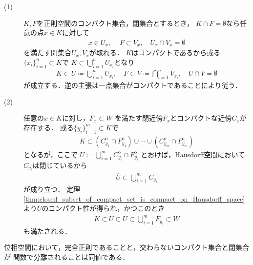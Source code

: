 	\begin{prf}\mbox{}
		\begin{description}
			\item[(1)]
				$K,F$を正則空間のコンパクト集合，閉集合とするとき，
				$K \cap F = \emptyset$なら任意の点$x \in K$に対して
				\begin{align}
					x \in U_x,\ \quad F \subset V_x,
					\quad U_x \cap V_x = \emptyset
				\end{align}
				を満たす開集合$U_x,V_x$が取れる．
				$K$はコンパクトであるから或る$\{x_i\}_{i=1}^n \subset K$で
				$K \subset \bigcup_{i=1}^n U_{x_i}$となり
				\begin{align}
					K \subset U \coloneqq \bigcup_{i=1}^n U_{x_i},
					\quad F \subset V \coloneqq \bigcap_{i=1}^n V_{x_i},
					\quad U \cap V = \emptyset
				\end{align}
				が成立する．逆の主張は一点集合がコンパクトであることにより従う．
			\item[(2)]
				任意の$x \in K$に対し，$F_x \subset W$
				を満たす閉近傍$F_x$とコンパクトな近傍$C_x$が存在する．
				或る$\{y_i\}_{i=1}^m \subset K$で
				\begin{align}
					K \subset 
					\left(C_{y_1}^{\mathrm{o}} \cap F_{y_1}^{\mathrm{o}}\right) 
					\cup \cdots \cup 
					\left(C_{y_m}^{\mathrm{o}} \cap F_{y_m}^{\mathrm{o}}\right)
				\end{align}
				となるが，ここで
				$U \coloneqq 
				\bigcup_{i=1}^m C_{y_i}^{\mathrm{o}} \cap F_{y_i}^{\mathrm{o}}$
				とおけば，Hausdorff空間において$C_{y_i}$は閉じているから
				\begin{align}
					\overline{U} \subset \bigcup_{i=1}^m C_{y_i}
				\end{align}
				が成り立つ．
				定理\ref{thm:closed_subset_of_compact_set_is_compact_on_Hausdorff_space}
				より$\overline{U}$のコンパクト性が得られ，かつこのとき
				\begin{align}
					K \subset U \subset \overline{U} \subset \bigcup_{i=1}^m F_{y_i}
					\subset W
				\end{align}
				も満たされる．
				\QED
		\end{description}
	\end{prf}
	
	\begin{screen}
		\begin{thm}[完全正則なら正則]
		\end{thm}
	\end{screen}
	
	\begin{screen}
		\begin{thm}[完全正則空間とは交わらないコンパクト集合と閉集合が関数で分離される空間]
			位相空間において，完全正則であることと，交わらないコンパクト集合と閉集合が
			関数で分離されることは同値である．
		\end{thm}
	\end{screen}
	

